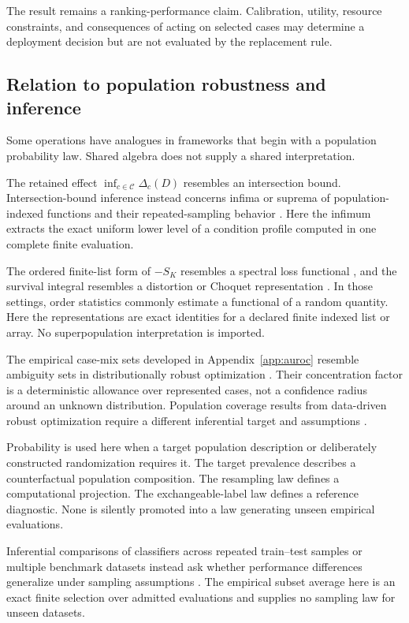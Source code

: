 \documentclass[11pt]{article}
\newcommand{\CSet}{\mathcal{C}}
\theoremstyle{remark}
\begin{document}
The result remains a ranking-performance claim. Calibration, utility, resource
constraints, and consequences of acting on selected cases may determine a
deployment decision but are not evaluated by the replacement rule.

\subsection{Relation to population robustness and inference}
\label{sec:related-frameworks}

Some operations have analogues in frameworks that begin with a population
probability law. Shared algebra does not supply a shared interpretation.

The retained effect $\inf_{c\in\CSet}\Delta_c(D)$ resembles an intersection
bound. Intersection-bound inference instead concerns infima or suprema of
population-indexed functions and their repeated-sampling behavior
\cite{chernozhukov2013intersection}. Here the infimum extracts the exact uniform
lower level of a condition profile computed in one complete finite evaluation.

The ordered finite-list form of $-S_K$ resembles a spectral loss functional
\cite{acerbi2002spectral}, and the survival integral resembles a distortion or
Choquet representation \cite{wang1996premium}. In those settings, order
statistics commonly estimate a functional of a random quantity. Here the
representations are exact identities for a declared finite indexed list or
array. No superpopulation interpretation is imported.

The empirical case-mix sets developed in Appendix~\ref{app:auroc} resemble
ambiguity sets in distributionally robust optimization
\cite{shapiro2017distributionally,bental2013robust}. Their concentration factor
is a deterministic allowance over represented cases, not a confidence radius
around an unknown distribution. Population coverage results from data-driven
robust optimization require a different inferential target and assumptions
\cite{duchi2021statistics}.

Probability is used here when a target population description or deliberately
constructed randomization requires it. The target prevalence describes a
counterfactual population composition. The resampling law defines a
computational projection. The exchangeable-label law defines a reference
diagnostic. None is silently promoted into a law generating unseen empirical
evaluations.

Inferential comparisons of classifiers across repeated train--test samples or
multiple benchmark datasets instead ask whether performance differences
generalize under sampling assumptions
\cite{nadeau2003inference,bouckaert2004estimating,demsar2006statistical}. The
empirical subset average here is an exact finite selection over admitted
evaluations and supplies no sampling law for unseen datasets.
\end{document}
